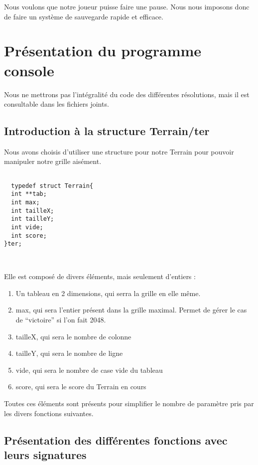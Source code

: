 \documentclass[letter]{article}
\begin{document}
Nous voulons que notre joueur puisse faire une pause. Nous nous imposons donc de faire un système de sauvegarde rapide et efficace.



\section{Présentation du programme console}
\label{sec:org0ffd9a7}

Nous ne mettrons pas l'intégralité du code des différentes résolutions, mais il est consultable dans les fichiers joints.

\subsection{Introduction à la structure Terrain/ter}
\label{sec:orgb4268e1}

Nous avons choisis d'utiliser une structure pour notre Terrain pour pouvoir manipuler notre grille aisément.

\begin{verbatim}

  typedef struct Terrain{
  int **tab;
  int max;
  int tailleX;
  int tailleY;
  int vide;
  int score;
}ter;



\end{verbatim}

Elle est composé de divers éléments, mais seulement d'entiers :

\begin{enumerate}
\item Un tableau en 2 dimensions, qui serra la grille en elle même.
\item max, qui sera l'entier présent dans la grille maximal. Permet de gérer le cas de “victoire” si l'on fait 2048.
\item tailleX, qui sera le nombre de colonne
\item tailleY, qui sera le nombre de ligne
\item vide, qui sera le nombre de case vide du tableau
\item score, qui sera le score du Terrain en cours
\end{enumerate}


Toutes ces éléments sont présents pour simplifier le nombre de paramètre pris par les divers fonctions suivantes.




\subsection{Présentation des différentes fonctions  avec leurs signatures}
\label{sec:org1aa6e88}
\end{document}
